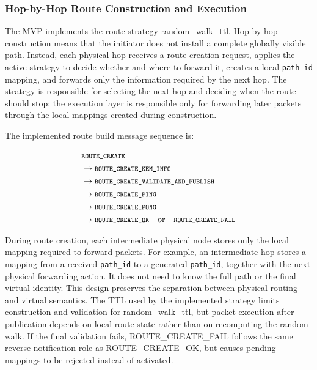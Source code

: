 \documentclass[12pt,a4paper]{article}
\newcommand{\codebreak}[1]{{\footnotesize\ttfamily #1}}
\newcommand{\codemath}[1]{\mbox{\footnotesize\ttfamily #1}}
\begin{document}
\subsubsection{Hop-by-Hop Route Construction and Execution}
\label{subsec:hop-by-hop-route-construction-execution}

The MVP implements the route strategy \codebreak{random\_\allowbreak{}walk\_\allowbreak{}ttl}. Hop-by-hop construction means that the initiator does not install a complete globally visible path. Instead, each physical hop receives a route creation request, applies the active strategy to decide whether and where to forward it, creates a local \texttt{path\_id} mapping, and forwards only the information required by the next hop. The strategy is responsible for selecting the next hop and deciding when the route should stop; the execution layer is responsible only for forwarding later packets through the local mappings created during construction.

The implemented route build message sequence is:

\begin{equation}
\begin{aligned}
&\codemath{ROUTE\_\allowbreak{}CREATE} \\
&\rightarrow \codemath{ROUTE\_\allowbreak{}CREATE\_\allowbreak{}KEM\_\allowbreak{}INFO} \\
&\rightarrow \codemath{ROUTE\_\allowbreak{}CREATE\_\allowbreak{}VALIDATE\_\allowbreak{}AND\_\allowbreak{}PUBLISH} \\
&\rightarrow \codemath{ROUTE\_\allowbreak{}CREATE\_\allowbreak{}PING} \\
&\rightarrow \codemath{ROUTE\_\allowbreak{}CREATE\_\allowbreak{}PONG} \\
&\rightarrow \codemath{ROUTE\_\allowbreak{}CREATE\_\allowbreak{}OK}
\quad \text{or} \quad
\codemath{ROUTE\_\allowbreak{}CREATE\_\allowbreak{}FAIL}
\end{aligned}
\end{equation}

During route creation, each intermediate physical node stores only the local mapping required to forward packets. For example, an intermediate hop stores a mapping from a received \texttt{path\_id} to a generated \texttt{path\_id}, together with the next physical forwarding action. It does not need to know the full path or the final virtual identity. This design preserves the separation between physical routing and virtual semantics. The TTL used by the implemented strategy limits construction and validation for \codebreak{random\_\allowbreak{}walk\_\allowbreak{}ttl}, but packet execution after publication depends on local route state rather than on recomputing the random walk. If the final validation fails, \codebreak{ROUTE\_\allowbreak{}CREATE\_\allowbreak{}FAIL} follows the same reverse notification role as \codebreak{ROUTE\_\allowbreak{}CREATE\_\allowbreak{}OK}, but causes pending mappings to be rejected instead of activated.
\end{document}
